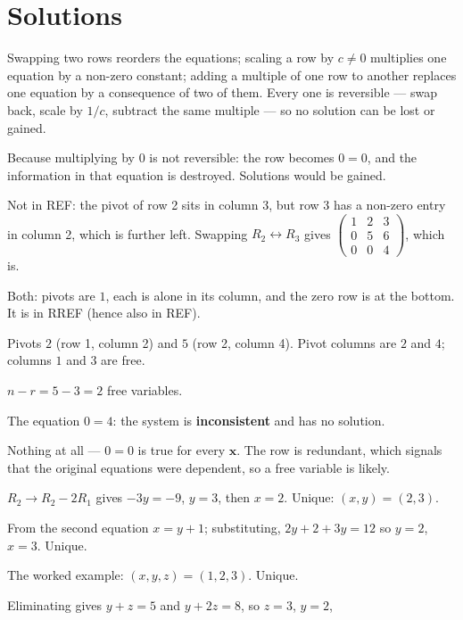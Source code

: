 \section{Solutions}

\begin{solutions}
  \item Swapping two rows reorders the equations; scaling a row by $c\neq0$
        multiplies one equation by a non-zero constant; adding a multiple of
        one row to another replaces one equation by a consequence of two of
        them. Every one is reversible --- swap back, scale by $1/c$,
        subtract the same multiple --- so no solution can be lost or
        gained.
  \item Because multiplying by $0$ is not reversible: the row becomes
        $0=0$, and the information in that equation is destroyed. Solutions
        would be gained.
  \item Not in REF: the pivot of row 2 sits in column 3, but row 3 has a
        non-zero entry in column 2, which is further left. Swapping
        $R_{2}\leftrightarrow R_{3}$ gives
        $\begin{pmatrix}1&2&3\\0&5&6\\0&0&4\end{pmatrix}$, which is.
  \item Both: pivots are $1$, each is alone in its column, and the zero row
        is at the bottom. It is in RREF (hence also in REF).
  \item Pivots $2$ (row 1, column 2) and $5$ (row 2, column 4). Pivot
        columns are $2$ and $4$; columns $1$ and $3$ are free.
  \item $n-r=5-3=2$ free variables.
  \item The equation $0=4$: the system is \textbf{inconsistent} and has no
        solution.
  \item Nothing at all --- $0=0$ is true for every $\mathbf{x}$. The row is
        redundant, which signals that the original equations were
        dependent, so a free variable is likely.
  \item $R_{2}\to R_{2}-2R_{1}$ gives $-3y=-9$, $y=3$, then $x=2$. Unique:
        $(x,y)=(2,3)$.
  \item From the second equation $x=y+1$; substituting,
        $2y+2+3y=12$ so $y=2$, $x=3$. Unique.
  \item The worked example: $(x,y,z)=(1,2,3)$. Unique.
  \item Eliminating gives $y+z=5$ and $y+2z=8$, so $z=3$, $y=2$,

\end{solutions}
